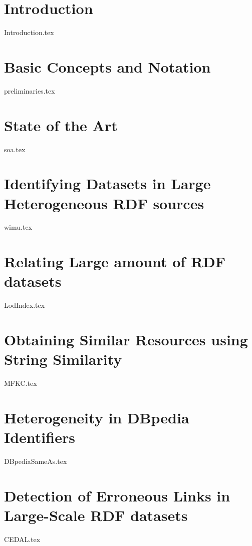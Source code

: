 \documentclass[ oneside,openright,titlepage,numbers=noenddot,headinclude,%
                footinclude=true,cleardoublepage=empty,abstractoff, %
                BCOR=5mm,paper=a4,fontsize=11pt,%
                 ngerman,american,%
                ]{scrreprt}
\begin{document}
\newpage
\chapter{Introduction}

\renewcommand{\thepage}{\arabic{page}}
\setcounter{page}{1}

{Introduction.tex}

\newpage
\chapter{Basic Concepts and Notation} \label{ch:preliminaries}
{preliminaries.tex}

\newpage
\chapter{State of the Art} \label{ch:soa}
{soa.tex}

\newpage
\chapter{Identifying Datasets in Large Heterogeneous RDF sources} \label{ch:wimu}
{wimu.tex}

\newpage
\chapter{Relating Large amount of RDF datasets} \label{ch:lodindex}
{LodIndex.tex}

\newpage
\chapter{Obtaining Similar Resources using String Similarity} \label{ch:mfkc}
{MFKC.tex}

\newpage
\chapter{Heterogeneity in DBpedia Identifiers} \label{ch:dbpediasameas}
{DBpediaSameAs.tex}

\newpage
\chapter{Detection of Erroneous Links in Large-Scale RDF datasets} \label{ch:cedal}
{CEDAL.tex}

\newpage
\end{document}
